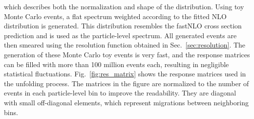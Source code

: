 which describes both the normalization and shape of the distribution. Using toy
Monte Carlo events, a flat \ptavg spectrum weighted according to the fitted NLO
distribution is generated. This distribution resembles the fastNLO cross section
prediction and is used as the particle-level \ptavg spectrum. All generated
events are then smeared using the resolution function obtained in
Sec.~\ref{sec:resolution}. The generation of these Monte Carlo toy events is
very fast, and the response matrices can be filled with more than 100 million
events each, resulting in negligible statistical fluctuations.
Fig.~\ref{fig:res_matrix} shows the response matrices used in the unfolding
process. The matrices in the figure are normalized to the number of events in
each particle-level bin to improve the readability. They are diagonal with small
off-diagonal elements, which represent migrations between neighboring \ptavg
bins.

